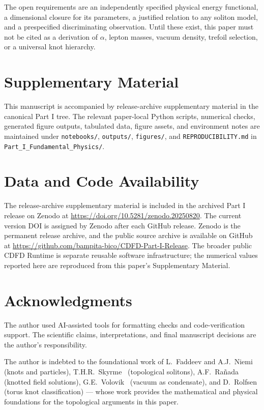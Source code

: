 \documentclass[11pt]{article}
\begin{document}
The open requirements are an independently specified physical energy functional,
a dimensional closure for its parameters, a justified relation to any soliton
model, and a prespecified discriminating observation. Until these exist, this
paper must not be cited as a derivation of $\alpha$, lepton masses, vacuum density,
trefoil selection, or a universal knot hierarchy.


\section*{Supplementary Material}

This manuscript is accompanied by release-archive supplementary material in
the canonical Part I tree. The relevant paper-local Python scripts, numerical checks, generated figure outputs,
tabulated data, figure assets, and environment notes are maintained under
\texttt{notebooks/}, \texttt{outputs/}, \texttt{figures/}, and
\texttt{REPRODUCIBILITY.md} in \texttt{Part\_I\_Fundamental\_Physics/}.


\section*{Data and Code Availability}

The release-archive supplementary material is included in the archived Part I
release on Zenodo at \url{https://doi.org/10.5281/zenodo.20250820}. The current version DOI is assigned by Zenodo after each GitHub release. Zenodo is the
permanent release archive, and the public source archive is available on GitHub at
\url{https://github.com/bampita-bico/CDFD-Part-I-Release}. The broader public CDFD
Runtime is separate reusable software infrastructure; the numerical values reported
here are reproduced from this paper's Supplementary Material.


\section*{Acknowledgments}
The author used AI-assisted tools for formatting checks and code-verification
support. The scientific claims, interpretations, and final manuscript decisions
are the author's responsibility.

The author is indebted to the foundational work of
L.~Faddeev and A.J.~Niemi~\cite{FaddeevNiemi1997} (knots and particles),
T.H.R.~Skyrme~\cite{Skyrme1961} (topological solitons),
A.F.~Ra\~{n}ada~\cite{Ranada1989} (knotted field solutions),
G.E.~Volovik~\cite{Volovik2003} (vacuum as condensate),
and D.~Rolfsen~\cite{Rolfsen1976} (torus knot classification)
--- whose work provides the mathematical and physical foundations
for the topological arguments in this paper.
\end{document}
